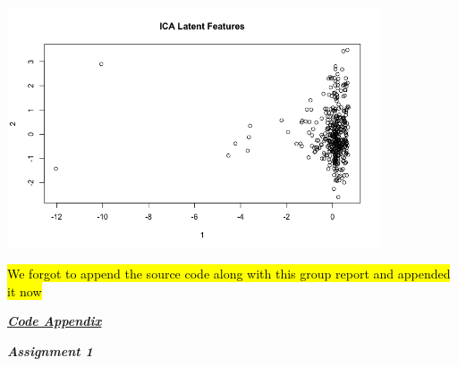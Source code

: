 \documentclass[a4paper,10pt]{article}
\begin{document}
\begin{center}
  \includegraphics[width=110mm,scale=0.10]{Scoreplot_Latent_Features_ICA.png}
\end{center} \par
\vspace{0.5cm}
\hl{We forgot to append the source code along with this group report and appended 
it now} \par
\huge \textbf{\emph{\underline{Code Appendix}}} \par
\large \textit{\textbf{Assignment 1}} \par
\end{document}
